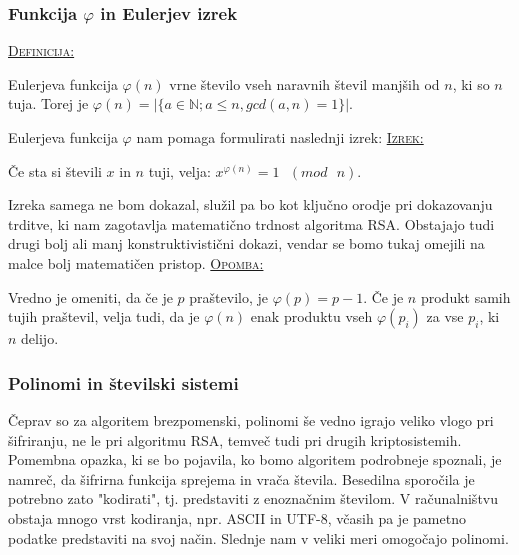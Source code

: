 \documentclass[a4paper, 12pt]{article} %
\newenvironment{matematika}[1]{
\textcolor{bostonuniversityred}{\underline{\textsc{#1:}}}
}{
}
\begin{document}
\subsubsection{Funkcija $\varphi$ in Eulerjev izrek}

\begin{matematika}{Definicija}
Eulerjeva funkcija $\varphi (n)$ vrne število vseh naravnih števil manjših od $n$, ki so $n$ tuja. Torej je $\varphi (n) = | \{ a \in \mathbb{N}; a \leq n, gcd(a, n) = 1 \} |$. \\
\end{matematika}

Eulerjeva funkcija $\varphi$ nam pomaga formulirati naslednji izrek:
\newline
\newline
\begin{matematika}{Izrek}
Če sta si števili $x$ in $n$ tuji, velja:
$x^{\varphi (n)} = 1 \text{ } (mod \text{ } n)$. \\
\end{matematika}

Izreka samega ne bom dokazal, služil pa bo kot ključno orodje pri dokazovanju trditve, ki nam zagotavlja matematično trdnost algoritma RSA. Obstajajo tudi drugi bolj ali manj konstruktivistični dokazi, vendar se bomo tukaj omejili na malce bolj matematičen pristop.
\newline
\newline
\begin{matematika}{Opomba}
Vredno je omeniti, da če je $p$ praštevilo, je $\varphi (p) = p - 1$. Če je $n$ produkt samih tujih praštevil, velja tudi, da je $\varphi (n)$ enak produktu vseh $\varphi (p_i)$ za vse $p_i$, ki $n$ delijo.
\end{matematika}

\subsubsection{Polinomi in številski sistemi}

Čeprav so za algoritem brezpomenski, polinomi še vedno igrajo veliko vlogo pri šifriranju, ne le pri algoritmu RSA, temveč tudi pri drugih kriptosistemih. Pomembna opazka, ki se bo pojavila, ko bomo algoritem podrobneje spoznali, je namreč, da šifrirna funkcija sprejema in vrača števila. Besedilna sporočila je potrebno zato "kodirati", tj. predstaviti z enoznačnim številom. V računalništvu obstaja mnogo vrst kodiranja, npr. ASCII in UTF-8, včasih pa je pametno podatke predstaviti na svoj način. Slednje nam v veliki meri omogočajo polinomi. \\
\end{document}

